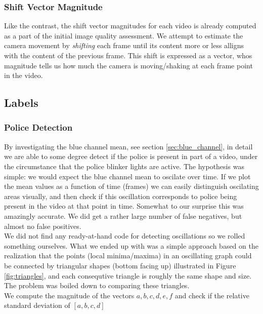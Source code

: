 \subsubsection{Shift Vector Magnitude}
%
Like the contrast, the shift vector magnitudes for each video is already computed as a part of the initial image quality assessment. We attempt to estimate the camera movement by \textit{shifting} each frame until its content more or less alligns with the content of the previous frame. This shift is expressed as a vector, whos magnitude tells us how much the camera is moving/shaking at each frame point in the video.
%
\subsection{Labels}
%

%
\subsubsection{Police Detection}\label{sec:police_detection}
%
By investigating the blue channel mean, see section \ref{sec:blue_channel}, in detail we are able to some degree detect if the police is present
%
%
in part of a video, under the circumstance that the police blinker lights are active. The hypothesis was simple: we would expect the blue channel mean to oscilate over time. If we plot the mean values as a function of time (frames) we can easily distinguish oscilating areas visually, and then check if this oscillation corresponds to police being present in the video at that point in time. Somewhat to our surprise this was amazingly accurate. We did get a rather large number of false negatives, but almost no false positives.\\
%
%
We did not find any ready-at-hand code for detecting oscillations so we rolled
%
%
something ourselves. What we ended up with was a simple approach based on the realization that the points (local minima/maxima) in an oscillating graph could be connected by triangular shapes (bottom facing up) illustrated in Figure \ref{fig:triangles}, and each consequtive triangle is roughly the same shape and size. The problem was boiled down to comparing these triangles.\\
We compute the magnitude of the vectors $a,b,c,d,e,f$ and check if the relative standard deviation of $[a,b,c,d]$
%
